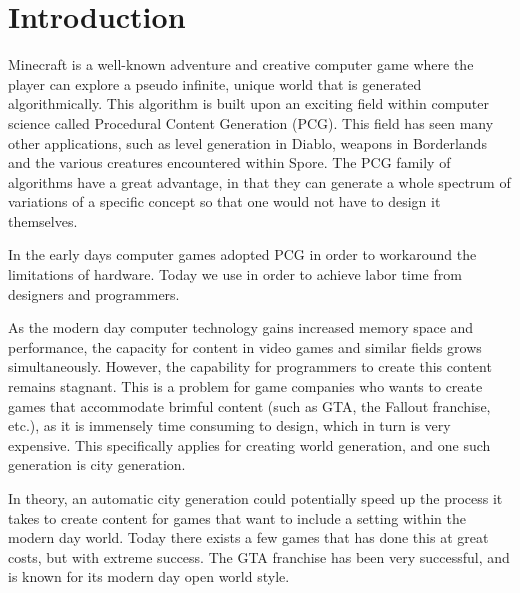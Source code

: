 \section{Introduction}
Minecraft is a well-known adventure and creative computer game where the player can explore a pseudo infinite, unique world that is generated algorithmically.
This algorithm is built upon an exciting field within computer science called Procedural Content Generation (PCG).
This field has seen many other applications, such as level generation in Diablo, weapons in Borderlands and the various creatures encountered within Spore.
The PCG family of algorithms have a great advantage, in that they can generate a whole spectrum of variations of a specific concept so that one would not have to design it themselves.

In the early days computer games adopted PCG in order to workaround the limitations of hardware.
Today we use in order to achieve labor time from designers and programmers.

As the modern day computer technology gains increased memory space and performance, the capacity for content in video games and similar fields grows simultaneously.
However, the capability for programmers to create this content remains stagnant.
This is a problem for game companies who wants to create games that accommodate brimful content (such as GTA, the Fallout franchise, etc.), as it is immensely time consuming to design, which in turn is very expensive.
This specifically applies for creating world generation, and one such generation is city generation. 

In theory, an automatic city generation could potentially speed up the process it takes to create content for games that want to include a setting within the modern day world.
Today there exists a few games that has done this at great costs, but with extreme success.
The GTA franchise has been very successful, and is known for its modern day open world style.

